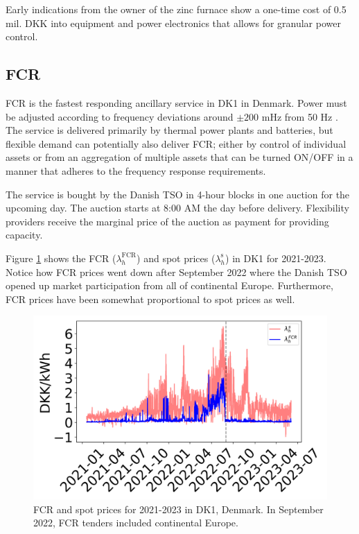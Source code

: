 \documentclass[lettersize,journal]{IEEEtran}
\begin{document}
Early indications from the owner of the zinc furnace show a one-time cost of 0.5 mil. DKK into equipment and power electronics that allows for granular power control.

\subsection{FCR}

FCR is the fastest responding ancillary service in DK1 in Denmark. Power must be adjusted according to frequency deviations around $\pm 200$ mHz from 50 Hz \cite{energinet:prequalification}. The service is delivered primarily by thermal power plants and batteries, but flexible demand can potentially also deliver FCR; either by control of individual assets or from an aggregation of multiple assets that can be turned ON/OFF in a manner that adheres to the frequency response requirements.

The service is bought by the Danish TSO in 4-hour blocks in one auction for the upcoming day. The auction starts at 8:00 AM the day before delivery. Flexibility providers receive the marginal price of the auction as payment for providing capacity.

Figure \ref{fig:fcr_prices_2022} shows the FCR ($\lambda_{h}^{\text{FCR}}$) and spot prices ($\lambda_{h}^{\text{s}}$) in DK1 for 2021-2023. Notice how FCR prices went down after September 2022 where the Danish TSO opened up market participation from all of continental Europe. Furthermore, FCR prices have been somewhat proportional to spot prices as well.

\begin{figure}[t]
    \centering
    \includegraphics[width=\columnwidth]{figures/fcr_prices.png}
    \caption{FCR and spot prices for 2021-2023 in DK1, Denmark. In September 2022, FCR tenders included continental Europe.}
    \label{fig:fcr_prices_2022}
\end{figure}
\end{document}
